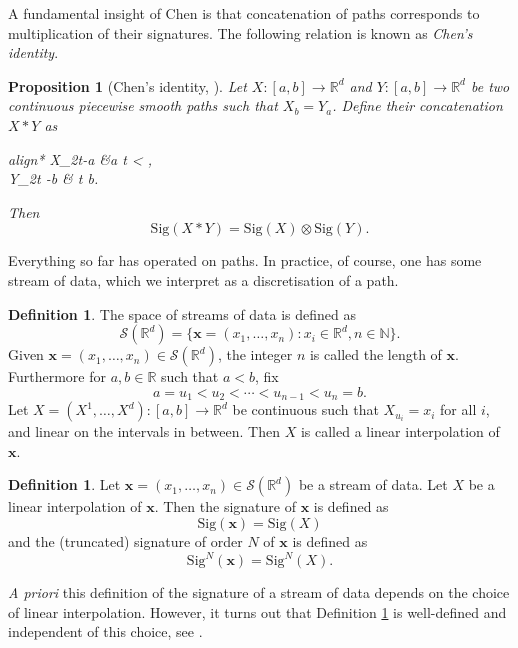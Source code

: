\documentclass{article}
\theoremstyle{plain}
\newtheorem{proposition}[thm]{Proposition}
\theoremstyle{definition}
\newtheorem{definition}[thm]{Definition}
\begin{document}
A fundamental insight of Chen is that concatenation of paths corresponds to multiplication of their signatures. The following relation is known as \textit{Chen's identity}.
\begin{proposition}[{Chen's identity, \cite[Theorem 2.12]{lyons1998differential}}]
	Let $X \colon [a,b] \to \mathbb R^d$ and $Y \colon [a,b] \to \mathbb R^d$ be two continuous piecewise smooth paths such that $X_b = Y_a$. Define their concatenation $X\ast Y$ as
	\begin{empheq}[left={(X\ast Y)_t = \empheqlbrace}]{align*}
	X_{2t-a} &\quad{}\quad a \leq t < ,\\
	Y_{2t -b}  &\quad{}\quad {} \leq t \leq b.
	\end{empheq}
	Then
	\begin{equation*}
	\mathrm{Sig}(X\ast Y) = \mathrm{Sig}(X) \otimes \mathrm{Sig}(Y).
	\end{equation*}
\end{proposition}

Everything so far has operated on paths. In practice, of course, one has some stream of data, which we interpret as a discretisation of a path.
\begin{definition}
	The space of streams of data is defined as
	\begin{equation*}
	\mathcal S(\mathbb R^d) = \{ \mathbf x=(x_1, \ldots, x_n) : x_i \in \mathbb R^d, n \in \mathbb N\}.
	\end{equation*}
	Given $\mathbf x=(x_1, \ldots, x_n) \in \mathcal S(\mathbb R^d)$, the integer $n$ is called the length of $\mathbf x$. Furthermore for $ a , b \in \mathbb R $ such that $ a < b $, fix
	\begin{equation*}
	a = u_1 < u_2 < \cdots < u_{n - 1} < u_n = b.
	\end{equation*}
	Let $X = (X^1, \ldots, X^d) \colon [a,b] \to \mathbb R^d$ be continuous such that $X_{u_i} = x_i$ for all $i$, and linear on the intervals in between. Then $X$ is called a linear interpolation of $\mathbf x$.
\end{definition}

\begin{definition}\label{def:sig}
	Let $\mathbf x=(x_1, \ldots, x_n)\in \mathcal S(\mathbb R^d)$ be a stream of data. Let $X$ be a linear interpolation of $\mathbf x$. Then the signature of $\mathbf x$ is defined as
	\begin{equation*}
	\mathrm{Sig}(\mathbf x) = \mathrm{Sig}(X)
	\end{equation*}
	and the (truncated) signature of order $N$ of $\mathbf x$ is defined as
	\begin{equation*}
	\mathrm{Sig}^N(\mathbf x) = \mathrm{Sig}^N(X).
	\end{equation*}
\end{definition}
\emph{A priori} this definition of the signature of a stream of data depends on the choice of linear interpolation. However, it turns out that Definition \ref{def:sig} is well-defined and independent of this choice, see \cite[Lemma 2.12]{lyons1998differential}.
\end{document}
